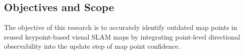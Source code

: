 \subsection{Objectives and Scope}
\label{objectives}

The objective of this research is to accurately identify outdated map points in reused keypoint-based visual SLAM maps by integrating point-level directional observability into the update step of map point confidence. 